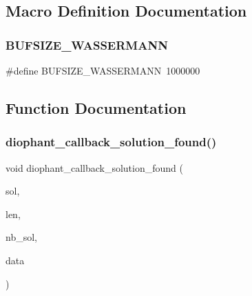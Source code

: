 \subsection{Macro Definition Documentation}
\mbox{\label{diophant_8_c_aa9cfffe01718f8328a3b5d39db098a80}} 
\subsubsection{\texorpdfstring{B\+U\+F\+S\+I\+Z\+E\+\_\+\+W\+A\+S\+S\+E\+R\+M\+A\+NN}{BUFSIZE\_WASSERMANN}}
{\footnotesize\ttfamily \#define B\+U\+F\+S\+I\+Z\+E\+\_\+\+W\+A\+S\+S\+E\+R\+M\+A\+NN~1000000}



\subsection{Function Documentation}
\mbox{\label{diophant_8_c_a9868811a3121c55ac9dc2a116aa15d0c}} 
\subsubsection{\texorpdfstring{diophant\+\_\+callback\+\_\+solution\+\_\+found()}{diophant\_callback\_solution\_found()}}
{\footnotesize\ttfamily void diophant\+\_\+callback\+\_\+solution\+\_\+found (\begin{DoxyParamCaption}\item[{\mbox{\hyperlink{galois_8h_a09fddde158a3a20bd2dcadb609de11dc}{I\+NT}} $\ast$}]{sol,  }\item[{\mbox{\hyperlink{galois_8h_a09fddde158a3a20bd2dcadb609de11dc}{I\+NT}}}]{len,  }\item[{\mbox{\hyperlink{galois_8h_a09fddde158a3a20bd2dcadb609de11dc}{I\+NT}}}]{nb\+\_\+sol,  }\item[{void $\ast$}]{data }\end{DoxyParamCaption})}



